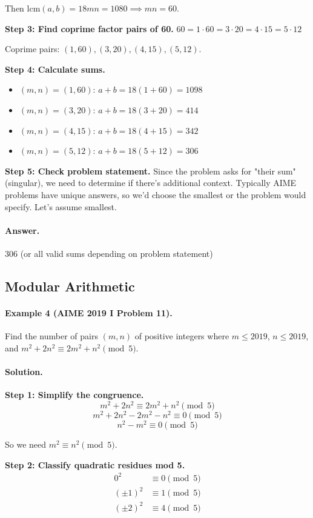 \documentclass[12pt]{extarticle}
\begin{document}
Then $\mathrm{lcm}(a,b) = 18mn = 1080 \implies mn = 60$.

\textbf{Step 3: Find coprime factor pairs of 60.} $60 = 1 \cdot 60 = 3 \cdot 20 = 4 \cdot 15 = 5 \cdot 12$

Coprime pairs: $(1,60), (3,20), (4,15), (5,12)$.

\textbf{Step 4: Calculate sums.}
\begin{itemize}
    \item $(m,n) = (1,60)$: $a+b = 18(1+60) = 1098$
    \item $(m,n) = (3,20)$: $a+b = 18(3+20) = 414$
    \item $(m,n) = (4,15)$: $a+b = 18(4+15) = 342$
    \item $(m,n) = (5,12)$: $a+b = 18(5+12) = 306$
\end{itemize}

\textbf{Step 5: Check problem statement.} Since the problem asks for "their sum" (singular), we need to determine if there's additional context. Typically AIME problems have unique answers, so we'd choose the smallest or the problem would specify. Let's assume smallest.

\paragraph{Answer.} $\boxed{306}$ (or all valid sums depending on problem statement)

\subsection{Modular Arithmetic}

\paragraph{Example 4 (AIME 2019 I Problem 11).} Find the number of pairs $(m, n)$ of positive integers where $m \le 2019$, $n \le 2019$, and $m^2 + 2n^2 \equiv 2m^2 + n^2 \pmod{5}$.

\paragraph{Solution.}
\textbf{Step 1: Simplify the congruence.}
\[
m^2 + 2n^2 \equiv 2m^2 + n^2 \pmod{5}
\]
\[
m^2 + 2n^2 - 2m^2 - n^2 \equiv 0 \pmod{5}
\]
\[
n^2 - m^2 \equiv 0 \pmod{5}
\]

So we need $m^2 \equiv n^2 \pmod{5}$.

\textbf{Step 2: Classify quadratic residues mod 5.}
\begin{align*}
0^2 &\equiv 0 \pmod{5}\\
(\pm 1)^2 &\equiv 1 \pmod{5}\\
(\pm 2)^2 &\equiv 4 \pmod{5}
\end{align*}
\end{document}
